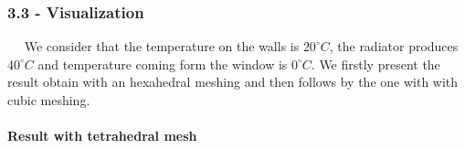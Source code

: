 \documentclass[11pt]{article}
\begin{document}
    \hypertarget{visualization}{%
\subsubsection{3.3 - Visualization}\label{visualization}}

~ ~We consider that the temperature on the walls is \(20^\circ C\), the
radiator produces \(40^\circ C\) and temperature coming form the window
is \(0^\circ C\). We firstly present the result obtain with an
hexahedral meshing and then follows by the one with with cubic meshing.

\hypertarget{result-with-tetrahedral-mesh}{%
\paragraph{Result with tetrahedral
mesh}\label{result-with-tetrahedral-mesh}}
\end{document}

